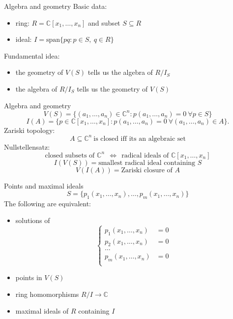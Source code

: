 \documentclass{beamer}
\begin{document}
\begin{frame}{Algebra and geometry}
Basic data:
\begin{itemize}
\pause
\item ring: $R = \mathbb C[x_1,\dots, x_n]$ and subset $S\subseteq R$
\pause
\item ideal: $I = \text{span}\{pq: p\in S,\ q\in R\}$
\end{itemize}
\pause
Fundamental idea:
\begin{itemize}
\pause
\item the geometry of $V(S)$ tells us the algebra of $R/I_S$
\pause
\item the algebra of $R/I_S$ tells us the geometry of $V(S)$
\end{itemize}
\end{frame}


\begin{frame}{Algebra and geometry}
$$V(S) = \{(a_1,\dots, a_n)\in\mathbb{C}^n: p(a_1,\dots, a_n) = 0\ \forall p\in S\}$$
\pause
$$I(A) = \{p\in \mathbb{C}[x_1,\dots, x_n]: p(a_1,\dots, a_n) = 0\ \forall (a_1,\dots, a_n)\in A\}.$$
\pause
Zariski topology:
$$A\subseteq \mathbb C^n\ \text{is closed iff its an algebraic set}$$
\pause
Nullstellensatz:
$$
\text{closed subsets of $\mathbb{C}^n$}
\ \ \Leftrightarrow \ \ 
\text{radical ideals of $\mathbb{C}[x_1,\dots,x_n]$}
$$
\pause
$$I(V(S)) = \text{smallest radical ideal containing $S$}$$
\pause
$$V(I(A)) = \text{Zariski closure of $A$}$$
\end{frame}


\begin{frame}{Points and maximal ideals}
$$S = \{p_1(x_1,\dots, x_n),\dots, p_m(x_1,\dots, x_n)\}$$
The following are equivalent:
\begin{itemize}
\pause
\item solutions of
$$\left\lbrace
\begin{array}{cc}
p_1(x_1,\dots, x_n) &= 0\\
p_2(x_1,\dots, x_n) &= 0\\
\dots\\
p_m(x_1,\dots, x_n) &= 0\\
\end{array}
\right.$$
\pause
\item points in $V(S)$
\pause
\item ring homomorphisms $R/I\rightarrow\mathbb{C}$
\pause
\item maximal ideals of $R$ containing $I$
\end{itemize}
\end{frame}
\end{document}
